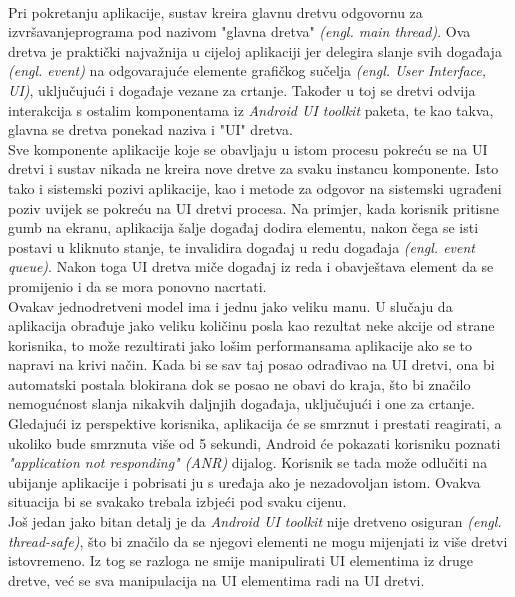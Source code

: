 \documentclass[times, utf8, zavrsni]{fer}
\begin{document}
\paragraph{}
Pri pokretanju aplikacije, sustav kreira glavnu dretvu odgovornu za izvršavanje\linebreak programa pod nazivom "glavna dretva" \textit{(engl. main thread)}. Ova dretva je praktički najvažnija u cijeloj aplikaciji jer delegira slanje svih događaja \textit{(engl. event)} na odgovarajuće elemente grafičkog sučelja \textit{(engl. User Interface, UI)}, uključujući i događaje vezane za crtanje. Također u toj se dretvi odvija interakcija s ostalim komponentama iz \textit{Android UI toolkit} paketa, te kao takva, glavna se dretva ponekad naziva i "UI" dretva.\\

Sve komponente aplikacije koje se obavljaju u istom procesu pokreću se na UI dretvi i sustav nikada ne kreira nove dretve za svaku instancu komponente. Isto tako i sistemski pozivi aplikacije, kao i metode za odgovor na sistemski ugrađeni poziv uvijek se pokreću na UI dretvi procesa. Na primjer, kada korisnik pritisne gumb na ekranu, aplikacija šalje događaj dodira elementu, nakon čega se isti postavi u kliknuto stanje, te invalidira događaj u redu događaja \textit{(engl. event queue)}. Nakon toga UI dretva miče događaj iz reda i obavještava element da se promijenio i da se mora ponovno nacrtati.\\

Ovakav jednodretveni model ima i jednu jako veliku manu. U slučaju da aplikacija obrađuje jako veliku količinu posla kao rezultat neke akcije od strane korisnika, to može rezultirati jako lošim performansama aplikacije ako se to napravi na krivi način. Kada bi se sav taj posao odrađivao na UI dretvi, ona bi automatski postala blokirana dok se posao ne obavi do kraja, što bi značilo nemogućnost slanja nikakvih daljnjih događaja, uključujući i one za crtanje. Gledajući iz perspektive korisnika, aplikacija će se smrznut i prestati reagirati, a ukoliko bude smrznuta više od 5 sekundi, Android će pokazati korisniku poznati \textit{"application not responding" (ANR)} dijalog. Korisnik se tada može odlučiti na ubijanje aplikacije i pobrisati ju s uređaja ako je nezadovoljan istom. Ovakva situacija bi se svakako trebala izbjeći pod svaku cijenu.\\

Još jedan jako bitan detalj je da \textit{Android UI toolkit} nije dretveno osiguran \textit{(engl. thread-safe)}, što bi značilo da se njegovi elementi ne mogu mijenjati iz više dretvi istovremeno. Iz tog se razloga ne smije manipulirati UI elementima iz druge dretve, već se sva manipulacija na UI elementima radi na UI dretvi.\\
\end{document}
